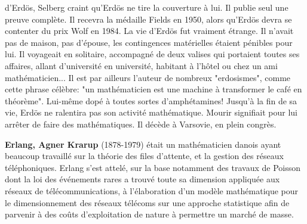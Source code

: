 d'Erdös, Selberg craint qu'Erdös ne tire la couverture à lui. Il publie seul une preuve complète. Il recevra la médaille Fields en 1950, alors qu'Erdös devra se contenter du prix Wolf en 1984. La vie d'Erdös fut vraiment étrange. Il n'avait pas de maison, pas d'épouse, les contingences matérielles étaient pénibles pour lui. Il voyageait en solitaire, accompagné de deux valises qui portaient toutes ses affaires, allant d'université en université, habitant à l'hôtel ou chez un ami mathématicien... Il est par ailleurs l'auteur de nombreux "erdosismes", comme cette phrase célèbre: "un mathématicien est une machine à transformer le café en théorème". Lui-même dopé à toutes sortes d'amphétamines! Jusqu'à la fin de sa vie, Erdös ne ralentira pas son activité mathématique. Mourir signifiait pour lui arrêter de faire des mathématiques. Il décède à Varsovie, en plein congrès.

\textbf{Erlang, Agner Krarup} (1878-1979) était un mathématicien danois ayant beaucoup travaillé sur la théorie des files d'attente, et la gestion des réseaux téléphoniques. Erlang s'est attelé, sur la base notamment des travaux de Poisson dont la loi des événements rares a trouvé toute sa dimension appliquée aux réseaux de télécommunications, à l'élaboration d'un modèle mathématique pour le dimensionnement des réseaux télécoms sur une approche statistique afin de parvenir à des coûts d'exploitation de nature à permettre un marché de masse.\\\\\\

